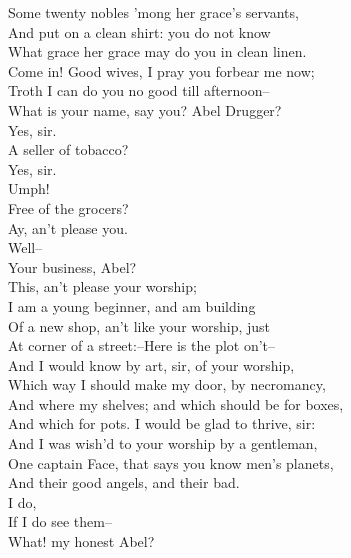 \documentclass{memoir}
\begin{document}
\begin{drama*}
 Some twenty nobles 'mong her grace's servants,\\
 And put on a clean shirt: you do not know\\
 What grace her grace may do you in clean linen.\\
\subtlespeaks {} Come in! Good wives, I pray you forbear me now;\\
 Troth I can do you no good till afternoon--\\
 What is your name, say you? Abel Drugger?\\
\druggerspeaks  Yes, sir.\\
\subtlespeaks {} A seller of tobacco?\\
\druggerspeaks {} Yes, sir.\\
\subtlespeaks  Umph!\\
 Free of the grocers?\\
\druggerspeaks {} Ay, an't please you.\\
\subtlespeaks {} Well--\\
 Your business, Abel?\\
\druggerspeaks {} This, an't please your worship;\\
 I am a young beginner, and am building\\
 Of a new shop, an't like your worship, just\\
 At corner of a street:--Here is the plot on't--\\
 And I would know by art, sir, of your worship,\\
 Which way I should make my door, by necromancy,\\
 And where my shelves; and which should be for boxes,\\
 And which for pots. I would be glad to thrive, sir:\\
 And I was wish'd to your worship by a gentleman,\\
 One captain Face, that says you know men's planets,\\
 And their good angels, and their bad.\\
\subtlespeaks {} I do,\\
 If I do see them--\\
\facespeaks {} What! my honest Abel?\\

\end{drama*}
\end{document}

